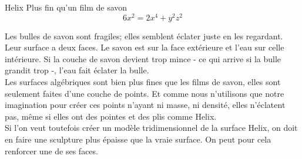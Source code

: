 \begin{surferPage}{Helix}
Plus fin qu'un film de savon\\
  \smallskip
\[6x^2	= 2x^4	+ y^2	z^2\]

\singlespacing
Les bulles de savon sont fragiles; elles semblent éclater juste en les regardant. Leur surface a deux faces. Le savon est sur la face extérieure et l'eau sur celle intérieure. Si la couche de savon devient trop mince - ce qui arrive si la bulle grandit trop -, l'eau fait éclater la bulle.\\
\vspace{0,3cm}
Les surfaces algébriques sont bien plus fines que les films de savon, elles sont seulement faites d'une couche de points. Et comme nous n'utilisons que notre imagination pour créer ces points n'ayant ni masse, ni densité, elles n'éclatent pas, même si elles ont des pointes et des plis comme Helix.\\
\vspace{0,3cm}
Si l'on veut toutefois créer un modèle tridimensionnel de la surface Helix, on doit en faire une sculpture plus épaisse que la vraie surface. On peut pour cela renforcer une de ses faces.
\end{surferPage}
